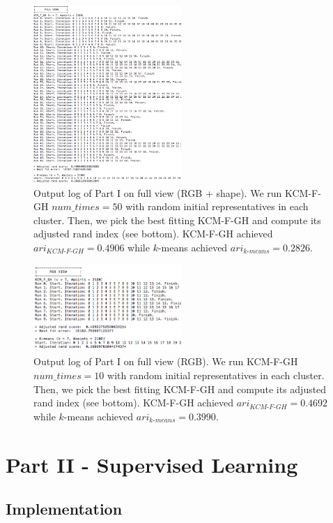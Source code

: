 \documentclass[conference]{IEEEtran}
\begin{document}
\begin{figure}
\label{part_i_full}
\includegraphics[width=0.50\textwidth]{part_i_full.png}
\caption{Output log of Part I on full view (RGB + shape). We run KCM-F-GH $num\_times = 50$ with random initial representatives in each cluster. Then, we pick the best fitting KCM-F-GH and compute its adjusted rand index (see bottom). KCM-F-GH achieved $ari_\textit{KCM-F-GH} = 0.4906$ while $k$-means achieved $ari_\textit{k-means} = 0.2826$.}
\end{figure}

\begin{figure}
\label{part_i_rgb}
\includegraphics[width=0.50\textwidth]{part_i_rgb.png}
\caption{Output log of Part I on full view (RGB). We run KCM-F-GH $num\_times = 10$ with random initial representatives in each cluster. Then, we pick the best fitting KCM-F-GH and compute its adjusted rand index (see bottom). KCM-F-GH achieved $ari_\textit{KCM-F-GH} = 0.4692$ while $k$-means achieved $ari_\textit{k-means} = 0.3990$.}
\end{figure}

\section{Part II - Supervised Learning}

\subsection{Implementation}
\end{document}
